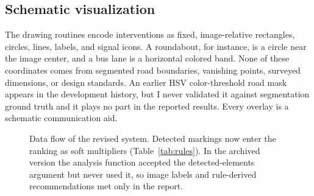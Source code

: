 \documentclass[11pt]{article}
\begin{document}
\subsection{Schematic visualization}
The drawing routines encode interventions as fixed, image-relative rectangles, circles, lines, labels, and signal icons. A roundabout, for instance, is a circle near the image center, and a bus lane is a horizontal colored band. None of these coordinates comes from segmented road boundaries, vanishing points, surveyed dimensions, or design standards. An earlier HSV color-threshold road mask appears in the development history, but I never validated it against segmentation ground truth and it plays no part in the reported results. Every overlay is a schematic communication aid.

\begin{figure}[!htbp]
\centering
{}
\caption{Data flow of the revised system. Detected markings now enter the ranking as soft multipliers (Table~\ref{tab:rules}). In the archived version the analysis function accepted the detected-elements argument but never used it, so image labels and rule-derived recommendations met only in the report.}
\label{fig:dataflow}
\end{figure}
\end{document}
